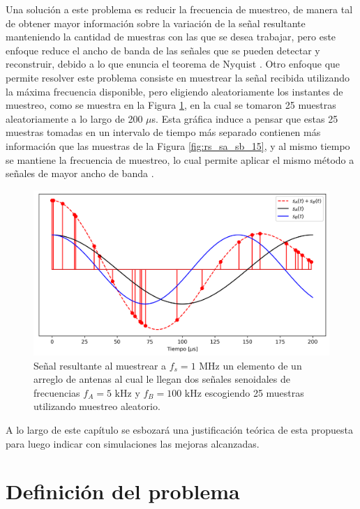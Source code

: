 Una solución a este problema es reducir la frecuencia de muestreo, de manera tal de obtener mayor información sobre la variación de la señal resultante manteniendo la cantidad de muestras con las que se desea trabajar, pero este enfoque reduce el ancho de banda de las señales que se pueden detectar y reconstruir, debido a lo que enuncia el teorema de Nyquist \cite{bib:nyquist}. Otro enfoque que permite resolver este problema consiste en muestrear la señal recibida utilizando la máxima frecuencia disponible, pero eligiendo aleatoriamente los instantes de muestreo, como se muestra en la Figura \ref{fig:rs_random_sampling_sine}, en la cual se tomaron 25 muestras aleatoriamente a lo largo de 200 $\mu$s. Esta gráfica induce a pensar que estas 25 muestras tomadas en un intervalo de tiempo más separado contienen más información que las muestras de la Figura \ref{fig:rs_sa_sb_15}, y al mismo tiempo se mantiene la frecuencia de muestreo, lo cual permite aplicar el mismo método a señales de mayor ancho de banda \cite{bib:bonetto}.
\begin{figure}[ht!]
    \centering
    \includegraphics[width=0.9\linewidth]{images/04-Random Sampling/rs_random_sampling_sine.png}
    \caption{Señal resultante al muestrear a $f_s=1\textrm{ MHz}$ un elemento de un arreglo de antenas al cual le llegan dos señales senoidales de frecuencias $f_A=5\textrm{ kHz}$ y $f_B={100\textrm{ kHz}}$ escogiendo 25 muestras utilizando muestreo aleatorio.}
    \label{fig:rs_random_sampling_sine}
\end{figure}

A lo largo de este capítulo se esbozará una justificación teórica de esta propuesta para luego indicar con simulaciones las mejoras alcanzadas.

\section{Definición del problema}\label{subc:rs_problema}

